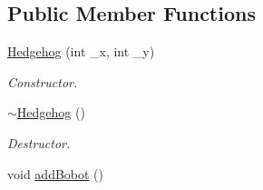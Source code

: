 \subsection*{Public Member Functions}
\begin{DoxyCompactItemize}
\item 
\hyperlink{classHedgehog_a0b832eb1f52c1c32a236706b5b560c3a}{Hedgehog} (int \-\_\-x, int \-\_\-y)
\begin{DoxyCompactList}\small\item\em Constructor. \end{DoxyCompactList}\item 
\hypertarget{classHedgehog_abc3df9705fd702c76bc3269b2ce9956b}{\hyperlink{classHedgehog_abc3df9705fd702c76bc3269b2ce9956b}{$\sim$\-Hedgehog} ()}\label{classHedgehog_abc3df9705fd702c76bc3269b2ce9956b}

\begin{DoxyCompactList}\small\item\em Destructor. \end{DoxyCompactList}\item 
\hypertarget{classHedgehog_ab8bbcff5c339a144eba0e6810d380512}{void \hyperlink{classHedgehog_ab8bbcff5c339a144eba0e6810d380512}{add\-Bobot} ()}\label{classHedgehog_ab8bbcff5c339a144eba0e6810d380512}


\end{DoxyCompactItemize}
